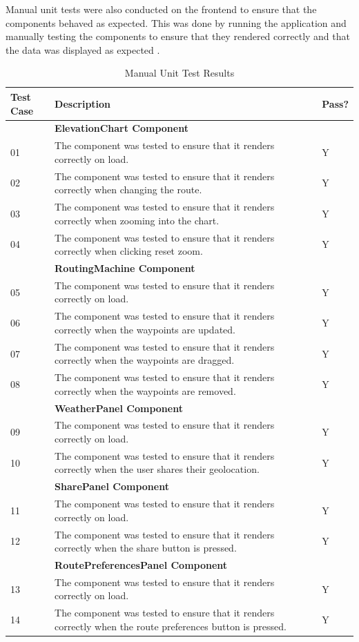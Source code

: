 Manual unit tests were also conducted on the frontend to ensure that the components behaved as expected. This was done by running the application and manually testing the components to ensure that they rendered correctly and that the data was displayed as expected .

\begin{table}
\caption{Manual Unit Test Results}
\label{tab:unit-test-results}
\renewcommand{\arraystretch}{1.5} %
\begin{tabular}{ p{1.85cm} p{10cm}  p{1.85cm} }
\hline
Test Case & Description & Pass?\\
\hline
 & \multicolumn{2}{p{11.85cm}}{\textbf{ElevationChart Component}}\\
01 & The component was tested to ensure that it renders correctly on load. & Y\\
02 & The component was tested to ensure that it renders correctly when changing the route. & Y\\
03 & The component was tested to ensure that it renders correctly when zooming into the chart. & Y\\
04 & The component was tested to ensure that it renders correctly when clicking reset zoom. & Y\\
\hline
 & \multicolumn{2}{p{11.85cm}}{\textbf{RoutingMachine Component}}\\
05 & The component was tested to ensure that it renders correctly on load. & Y\\
06 & The component was tested to ensure that it renders correctly when the waypoints are updated. & Y\\
07 & The component was tested to ensure that it renders correctly when the waypoints are dragged. & Y\\
08 & The component was tested to ensure that it renders correctly when the waypoints are removed. & Y\\
\hline
 & \multicolumn{2}{p{11.85cm}}{\textbf{WeatherPanel Component}}\\
09 & The component was tested to ensure that it renders correctly on load. & Y\\
10 & The component was tested to ensure that it renders correctly when the user shares their geolocation. & Y\\
\hline
 & \multicolumn{2}{p{11.85cm}}{\textbf{SharePanel Component}}\\
11 & The component was tested to ensure that it renders correctly on load. & Y\\
12 & The component was tested to ensure that it renders correctly when the share button is pressed. & Y\\
\hline
 & \multicolumn{2}{p{11.85cm}}{\textbf{RoutePreferencesPanel Component}}\\
13 & The component was tested to ensure that it renders correctly on load. & Y\\
14 & The component was tested to ensure that it renders correctly when the route preferences button is pressed. & Y\\
\end{tabular}
\end{table}

